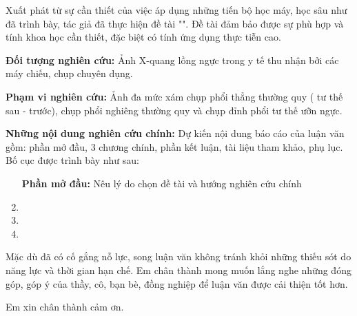 Xuất phát từ sự cần thiết của việc áp dụng những tiến bộ học máy, học sâu như đã trình bày, tác giả đã thực hiện đề tài "\tenluanvan". Đề tài đảm bảo được sự phù hợp và tính khoa học cần thiết, đặc biệt có tính ứng dụng thực tiễn cao. 

\textbf{Đối tượng nghiên cứu:} Ảnh X-quang lồng ngực trong y tế thu nhận bởi các máy chiếu, chụp chuyên dụng.

\textbf{Phạm vi nghiên cứu:} Ảnh đa mức xám chụp phổi thẳng thường quy ( tư thế sau - trước), chụp phổi nghiêng thường quy và chụp đỉnh phổi tư thế ưỡn ngực.

\textbf{Những nội dung nghiên cứu chính:} Dự kiến nội dung báo cáo của luận văn gồm: phần mở đầu, 3 chương chính, phần kết luận, tài liệu tham khảo, phụ lục. Bố cục được trình bày như sau:

\begin{enumerate}[wide, label=\bfseries Chương \arabic*:]
	\item [\bfseries Phần mở đầu:] Nêu lý do chọn đề tài và hướng nghiên cứu chính
	\item \tenchuongi 
	\item \tenchuongii
	\item \tenchuongiii
\end{enumerate}

Mặc dù đã có cố gắng nỗ lực, song luận văn không tránh khỏi những thiếu sót do năng lực và thời gian hạn chế. Em chân thành mong muốn lắng nghe những đóng góp, góp ý của thầy, cô, bạn bè, đồng nghiệp để luận văn được cải thiện tốt hơn.

Em xin chân thành cảm ơn.
